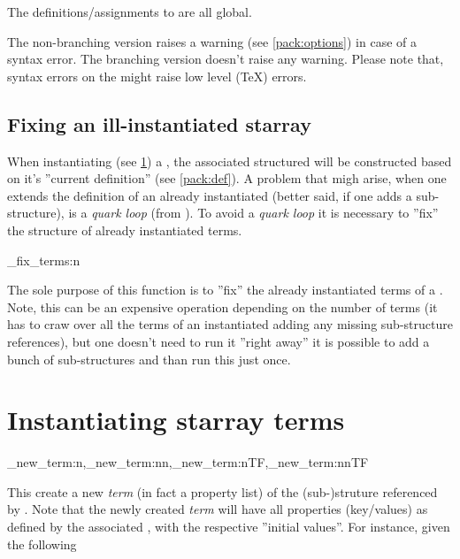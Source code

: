 \documentclass[10pt]{article}
\begin{document}

The definitions/assignments  to  are all global.


The non-branching version raises a warning (see \ref{pack:options}) in case of a  syntax error. The branching version doesn't raise any warning. Please note that, syntax errors on the  might raise low level (\TeX) errors.

\subsection{Fixing an ill-instantiated starray}\label{pack:def-fix}

When instantiating (see \ref{pack:instantiate}) a , the associated structured will be constructed based on it's ''current definition'' (see \ref{pack:def}). A problem that migh arise, when one extends the definition of an already instantiated   (better said, if one adds a sub-structure), is a \textsl{quark loop} (from ). To avoid a \textsl{quark loop} it is necessary to ''fix'' the structure of already instantiated terms.

\begin{codedescribe}{\starray_fix_terms:n}
\begin{codesyntax}%
\end{codesyntax}
\end{codedescribe}
The sole purpose of this function is to ''fix'' the already instantiated terms of a . Note, this can be an expensive operation depending on the number of terms (it has to craw over all the terms of an instantiated  adding any missing sub-structure references), but one doesn't need to run it ''right away'' it is possible to add a bunch of sub-structures and than run this just once.


\section{Instantiating starray terms}\label{pack:instantiate}

\begin{codedescribe}{\starray_new_term:n,\starray_new_term:nn,\starray_new_term:nTF,\starray_new_term:nnTF}
\begin{codesyntax}%
\end{codesyntax}
\end{codedescribe}
This create a new \textsl{term} (in fact a property list) of the (sub-)struture referenced by . Note that the newly created \textsl{term} will have all properties (key/values) as defined by the associated , with the respective ''initial values''. For instance, given the following 
\end{document}
